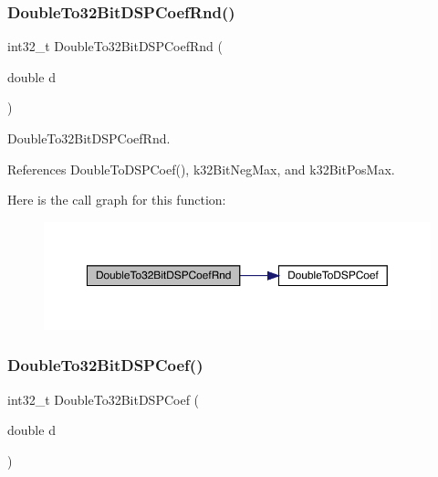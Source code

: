 \subsubsection{\texorpdfstring{DoubleTo32BitDSPCoefRnd()}{DoubleTo32BitDSPCoefRnd()}}
{\footnotesize\ttfamily int32\+\_\+t Double\+To32\+Bit\+D\+S\+P\+Coef\+Rnd (\begin{DoxyParamCaption}\item[{double}]{d }\end{DoxyParamCaption})\hspace{0.3cm}{\ttfamily [inline]}}



Double\+To32\+Bit\+D\+S\+P\+Coef\+Rnd. 



References Double\+To\+D\+S\+P\+Coef(), k32\+Bit\+Neg\+Max, and k32\+Bit\+Pos\+Max.

Here is the call graph for this function\+:
\nopagebreak
\begin{figure}[H]
\begin{center}
\leavevmode
\includegraphics[width=350pt]{a00449_ab8477bacb0294598f49057507fb17810_cgraph}
\end{center}
\end{figure}
\mbox{\label{a00449_ac7d80281cdc671669f3f2d523b2960cf}} 
\subsubsection{\texorpdfstring{DoubleTo32BitDSPCoef()}{DoubleTo32BitDSPCoef()}}
{\footnotesize\ttfamily int32\+\_\+t Double\+To32\+Bit\+D\+S\+P\+Coef (\begin{DoxyParamCaption}\item[{double}]{d }\end{DoxyParamCaption})}

\mbox{\label{a00449_a3db78a10d239924fd403b9d2fed5b296}} 
